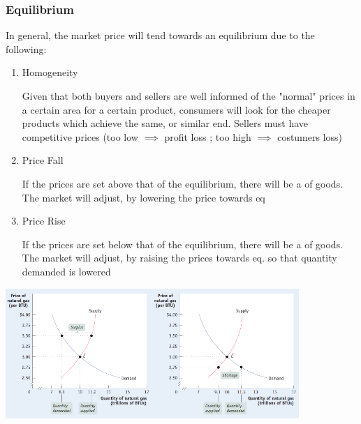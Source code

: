 \documentclass[english,course,draft]{Notes}
\begin{document}
\subsubsection{Equilibrium}




\par{In general, the market price will tend towards an equilibrium due to the following:}

\begin{enumerate}

\item Homogeneity

	\par{Given that both buyers and sellers are well informed of the "normal" prices in a certain area for a certain product, consumers will look for the cheaper products which achieve the same, or similar end. Sellers must have competitive prices (too low $\implies$ profit loss ; too high $\implies$ costumers loss)}
	
\item Price Fall

	\par{If the prices are set above that of the equilibrium, there will be a  of goods. The market will adjust, by lowering the price towards eq}
	
	
\item Price Rise

	\par{If the prices are set below that of the equilibrium, there will be a  of goods. The market will adjust, by raising the prices towards eq. so that quantity demanded is lowered}
	
\end{enumerate}


\includegraphics[width=15em]{supplySurplus}\includegraphics[width=15em]{supplyShortage}
\end{document}
